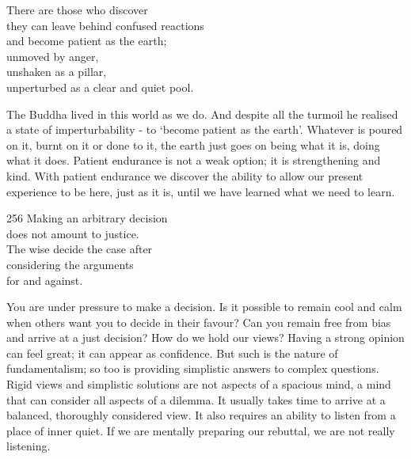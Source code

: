 
\begin{dhpVerse}{95}
\label{dhp-95}
There are those who discover\\
they can leave behind confused reactions\\
and become patient as the earth;\\
unmoved by anger,\\
unshaken as a pillar,\\
unperturbed as a clear and quiet pool.
\end{dhpVerse}

\begin{dhpRefl}

The Buddha lived in this world as we do. And despite all the turmoil
he realised a state of imperturbability - to `become patient as the
earth'. Whatever is poured on it, burnt on it or done to it, the
earth just goes on being what it is, doing what it does. Patient
endurance is not a weak option; it is strengthening and kind. With
patient endurance we discover the ability to allow our present
experience to be here, just as it is, until we have learned what we
need to learn.

\end{dhpRefl}


\begin{dhpVerse}{256}
\label{dhp-256}
Making an arbitrary decision\\
does not amount to justice.\\
The wise decide the case after\\
considering the arguments\\
for and against.
\end{dhpVerse}

\begin{dhpRefl}

You are under pressure to make a decision. Is it possible to remain
cool and calm when others want you to decide in their favour? Can
you remain free from bias and arrive at a just decision? How do we
hold our views? Having a strong opinion can feel great; it can appear
as confidence. But such is the nature of fundamentalism; so too is
providing simplistic answers to complex questions. Rigid views and
simplistic solutions are not aspects of a spacious mind, a mind that
can consider all aspects of a dilemma. It usually takes time to
arrive at a balanced, thoroughly considered view. It also requires an
ability to listen from a place of inner quiet. If we are mentally
preparing our rebuttal, we are not really listening.

\end{dhpRefl}

